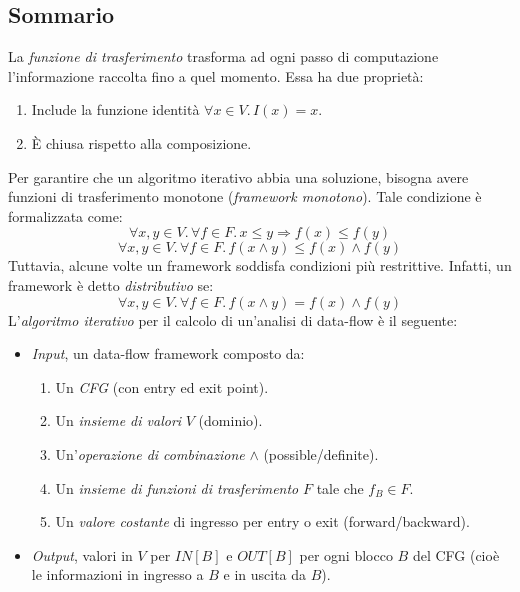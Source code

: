 \documentclass[a4paper,oneside,titlepage]{book}
\begin{document}
\subsection{Sommario}
La \textit{funzione di trasferimento} trasforma ad ogni passo di computazione l'informazione raccolta fino a quel momento. Essa ha due proprietà:
\begin{enumerate}
    \item Include la funzione identità $\forall x \in V. \, I(x) = x$.
    \item \`{E} chiusa rispetto alla composizione.
\end{enumerate}
Per garantire che un algoritmo iterativo abbia una soluzione, bisogna avere funzioni di trasferimento monotone (\textit{framework monotono}). Tale condizione è formalizzata come:
\[ \forall x,y \in V. \, \forall f \in F. \, x \leq y \Rightarrow f(x) \leq f(y) \]
\[ \forall x,y \in V. \, \forall f \in F. \, f(x \wedge y) \leq f(x) \wedge f(y) \]
Tuttavia, alcune volte un framework soddisfa condizioni più restrittive. Infatti, un framework è detto \textit{distributivo} se:
\[ \forall x,y \in V. \, \forall f \in F. \, f(x \wedge y) = f(x) \wedge f(y) \]
L'\textit{algoritmo iterativo} per il calcolo di un'analisi di data-flow è il seguente:
\begin{itemize}
    \item \textit{Input}, un data-flow framework composto da:
    \begin{enumerate}
        \item Un \textit{CFG} (con entry ed exit point).
        \item Un \textit{insieme di valori} $V$ (dominio).
        \item Un'\textit{operazione di combinazione} $\wedge$ (possible/definite).
        \item Un \textit{insieme di funzioni di trasferimento} $F$ tale che $f_B \in F$.
        \item Un \textit{valore costante} di ingresso per entry o exit (forward/backward).
    \end{enumerate}
    \item \textit{Output}, valori in $V$ per $IN[B]$ e $OUT[B]$ per ogni blocco $B$ del CFG (cioè le informazioni in ingresso a $B$ e in uscita da $B$).
\end{itemize}
\end{document}
